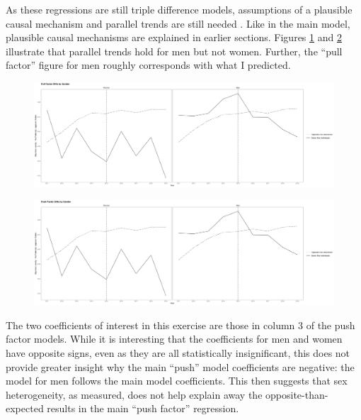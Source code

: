 \documentclass[12pt,letterpaper]{article}
\begin{document}
As these regressions are still triple difference models, assumptions of a plausible causal mechanism and parallel trends are still needed \citep{24, 25}. Like in the main model, plausible causal mechanisms are explained in earlier sections. Figures \ref{fig: sex_post_diffs} and \ref{fig: sex_ante_diffs} illustrate that parallel trends hold for men but not women. Further, the “pull factor” figure for men roughly corresponds with what I predicted.

\begin{figure}[htbp]
    \centering
    \includegraphics[width=1\linewidth]{outputs/summary_stats/sex_post_diffs.png}
    \caption{}
    \label{fig: sex_post_diffs}
\end{figure}
\begin{figure}[htbp]
    \centering
    \includegraphics[width=1\linewidth]{outputs/summary_stats/sex_ante_diffs.png}
    \caption{}
    \label{fig: sex_ante_diffs}
\end{figure}

The two coefficients of interest in this exercise are those in column 3 of the push factor models. While it is interesting that the coefficients for men and women have opposite signs, even as they are all statistically insignificant, this does not provide greater insight why the main “push” model coefficients are negative: the model for men follows the main model coefficients. This then suggests that sex heterogeneity, as measured, does not help explain away the opposite-than-expected results in the main “push factor” regression.
\end{document}
